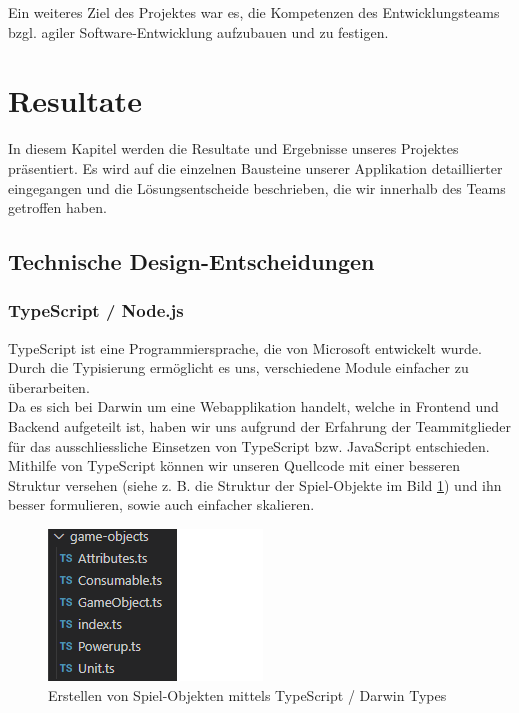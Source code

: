 \documentclass[11pt,a4paper,titlepage]{article}
\begin{document}
Ein weiteres Ziel des Projektes war es, die Kompetenzen des Entwicklungsteams bzgl. agiler Software-Entwicklung aufzubauen und zu festigen.

\newpage

\section{Resultate}
In diesem Kapitel werden die Resultate und Ergebnisse unseres Projektes präsentiert.
Es wird auf die einzelnen Bausteine unserer Applikation detaillierter eingegangen und die Lösungsentscheide beschrieben, die wir innerhalb des Teams getroffen haben.

\subsection{Technische Design-Entscheidungen}
\subsubsection{TypeScript / Node.js}
TypeScript ist eine Programmiersprache, die von Microsoft entwickelt wurde. Durch die Typisierung ermöglicht es uns, verschiedene Module einfacher zu überarbeiten.\\
Da es sich bei Darwin um eine Webapplikation handelt, welche in Frontend und Backend aufgeteilt ist, haben wir uns aufgrund der Erfahrung der Teammitglieder für das ausschliessliche Einsetzen von TypeScript bzw. JavaScript entschieden.
Mithilfe von TypeScript können wir unseren Quellcode mit einer besseren Struktur versehen (siehe z. B. die Struktur der Spiel-Objekte im Bild \ref{types}) und ihn besser formulieren, sowie auch einfacher skalieren.

\begin{figure}[H]
	\centering
	\includegraphics{darwintypes.png}
	\caption{Erstellen von Spiel-Objekten mittels TypeScript / Darwin Types}
	\label{types}
\end{figure}
\end{document}
